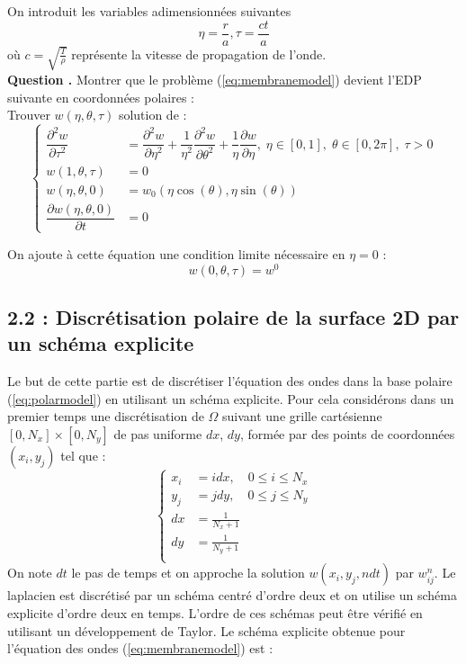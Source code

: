 \documentclass[a4,12pt]{article}
\newcounter{Nbquestion}
\newcommand*\question{%
\stepcounter{Nbquestion}%
\textbf{Question \theNbquestion. }}
\begin{document}
      On introduit les variables adimensionnées suivantes 
      \[
	\eta=\dfrac{r}{a},\tau=\dfrac{ct}{a}
      \]
      où $c=\sqrt{\frac{T}{\rho}}$ représente la vitesse de propagation  de l'onde.\\ 


	\question Montrer que le problème (\ref{eq:membranemodel}) devient l'EDP suivante en coordonnées polaires :\\

	Trouver $w(\eta,\theta,\tau)$ solution de :
	\begin{equation}
	  \left\{
	    \begin{array}{rl}
	      \dfrac{\partial^2 w}{\partial \tau^2} & =   \dfrac{\partial^2 w}{\partial \eta^2}+\dfrac{1}
	      {\eta^2}\dfrac{\partial^2 w}{\partial \theta^2}+\dfrac{1}{\eta}\dfrac{\partial w}{\partial \eta},\;\eta\in[0,1],\;		\theta\in[0,2\pi],\;\tau>0\\
	      w(1,\theta,\tau)& = 0  \\
	      w(\eta,\theta,0)& = w_0(\eta \cos(\theta),\eta \sin (\theta)) \\
	      \dfrac{\partial w(\eta,\theta,0)}{\partial t} & = 0
	    \end{array}
	    \right.
	    \label{eq:polarmodel}
	  \end{equation}

	  On ajoute à cette équation une condition limite nécessaire  en $\eta=0$ :
	  \[
	    w(0,\theta,\tau)=w^0
	  \]


	\subsection*{2.2 : Discrétisation polaire de la surface 2D par un schéma explicite }
	Le but de cette partie est de discrétiser l'équation des ondes dans la base polaire (\ref{eq:polarmodel}) en utilisant un schéma explicite. Pour cela considérons dans un premier temps une discrétisation de $\Omega $ suivant une grille cartésienne $[0,N_x]\times [0,N_y]$ de pas uniforme $dx$, $dy$, formée par des points de coordonnées $(x_i,y_j)$ tel que :
	\begin{equation*}{}
	  \left\{
	    \begin{array}{rl}
	      x_i &=i dx,\quad 0\leq i \leq N_x \\
	      y_j &=j dy,\quad  0\leq j \leq N_y \\
	      dx & =\frac{1}{N_x+1}\\
	      dy &=\frac{1}{N_y+1}\\
	    \end{array}
	    \right.
	  \end{equation*}
	  On note $dt$ le pas de temps et on approche la solution $w(x_i,y_j,ndt)$ par $w_{ij}^{n}$. Le laplacien est discrétisé  par un schéma centré d'ordre deux  et on utilise un schéma explicite d'ordre deux en temps. L'ordre de ces schémas peut être vérifié en utilisant un développement de Taylor. Le schéma explicite obtenue pour l'équation des ondes (\ref{eq:membranemodel}) est :
\end{document}
